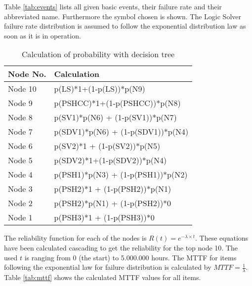 Table \ref{tab:events} lists all given basic events, their failure rate and their abbreviated name. Furthermore the symbol chosen is shown. The Logic Solver failure rate distribution is assumed to follow the exponential distribution law as soon as it is in operation.

\begin{table}[!ht]
\centering
\renewcommand{\arraystretch}{1.4}
\label{tab:probcalculation}
\begin{tabular}{|l|l|}
\hline
\textbf{Node No.} & \textbf{Calculation}  \\ \hline
Node 10           & p(LS)*1+(1-p(LS))*p(N9)                \\ \hline
Node 9            & p(PSHCC)*1+(1-p(PSHCC))*p(N8)         \\ \hline
Node 8            & p(SV1)*p(N6) + (1-p(SV1))*p(N7)         \\ \hline
Node 7            & p(SDV1)*p(N6) + (1-p(SDV1))*p(N4)     \\ \hline
Node 6            & p(SV2)*1 + (1-p(SV2))*p(N5)         \\ \hline
Node 5            & p(SDV2)*1+(1-p(SDV2))*p(N4)        \\ \hline
Node 4            & p(PSH1)*p(N3) + (1-p(PSH1))*p(N2)      \\ \hline
Node 3            & p(PSH2)*1 + (1-p(PSH2))*p(N1)       \\ \hline
Node 2            & p(PSH2)*p(N1) + (1-p(PSH2))*0       \\ \hline
Node 1            & p(PSH3)*1 + (1-p(PSH3))*0      \\ \hline
\end{tabular}
\caption{Calculation of probability with decision tree}
\end{table}

The reliability function for each of the nodes is $R(t) = e^{- \lambda\times t}$. These equations have been calculated cascading to get the reliability for the top node 10. The used $t$ is ranging from 0 (the start) to 5.000.000 hours. The MTTF for items following the exponential law for failure distribution is calculated by $MTTF = \frac{1}{\lambda}$. Table \ref{tab:mttf} shows the calculated MTTF values for all items.


